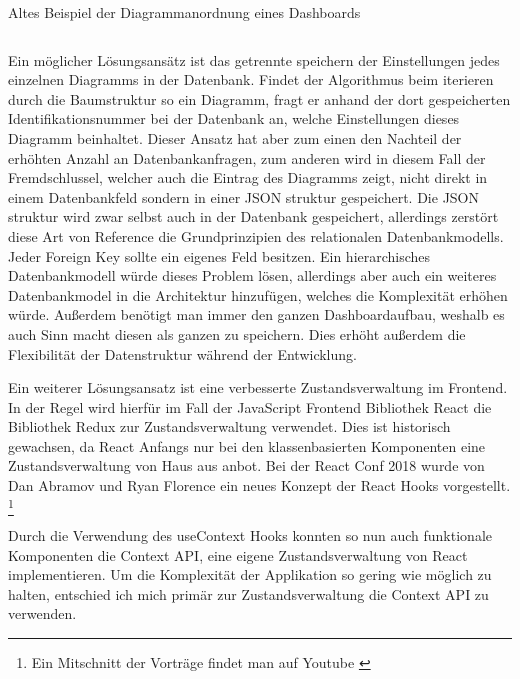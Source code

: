 \begin{listing}
    \label{lst:HelloJSX}
    \caption{Altes Beispiel der Diagrammanordnung eines Dashboards }
    \inputminted{jsx}{snippets/json/OldArrangement.json}
\end{listing}

Ein möglicher Lösungsansätz ist das getrennte speichern der Einstellungen jedes
einzelnen Diagramms in der Datenbank. Findet der Algorithmus beim iterieren durch
die Baumstruktur so ein Diagramm, fragt er anhand der dort gespeicherten 
Identifikationsnummer bei der Datenbank an, welche Einstellungen dieses Diagramm
beinhaltet. Dieser Ansatz hat aber zum einen den Nachteil der erhöhten Anzahl an
Datenbankanfragen, zum anderen wird in diesem Fall der Fremdschlussel, welcher auch
die Eintrag des Diagramms zeigt, nicht direkt in einem Datenbankfeld sondern in einer
JSON struktur gespeichert. Die JSON struktur wird zwar selbst auch in der Datenbank 
gespeichert, allerdings zerstört diese Art von Reference die Grundprinzipien des
relationalen Datenbankmodells. Jeder Foreign Key sollte ein eigenes Feld besitzen.
Ein hierarchisches Datenbankmodell würde dieses Problem lösen, allerdings aber auch
ein weiteres Datenbankmodel in die Architektur hinzufügen, welches die Komplexität
erhöhen würde. Außerdem benötigt man immer den ganzen Dashboardaufbau, weshalb es
auch Sinn macht diesen als ganzen zu speichern. Dies erhöht außerdem die Flexibilität
der Datenstruktur während der Entwicklung.

Ein weiterer Lösungsansatz ist eine verbesserte Zustandsverwaltung im Frontend. In der
Regel wird hierfür im Fall der JavaScript Frontend Bibliothek React die Bibliothek
Redux zur Zustandsverwaltung verwendet. Dies ist historisch gewachsen, da React Anfangs
nur bei den klassenbasierten Komponenten eine Zustandsverwaltung von Haus aus
anbot. Bei der React Conf 2018 wurde von Dan Abramov und Ryan Florence ein neues
Konzept der React Hooks vorgestellt.
\footnote{Ein Mitschnitt der Vorträge findet man auf Youtube \cite{}}

Durch die Verwendung des useContext Hooks konnten
so nun auch funktionale Komponenten die Context API, eine eigene Zustandsverwaltung von React implementieren.
Um die Komplexität der Applikation so gering wie möglich zu halten, entschied ich mich
primär zur Zustandsverwaltung die Context API zu verwenden.




